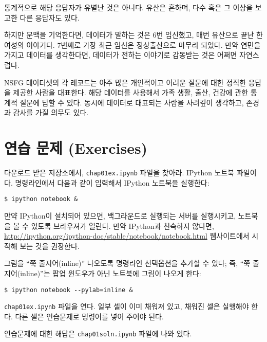 통계적으로 해당 응답자가 유별난 것은 아니다. 유산은 흔하며, 다수 혹은 그 이상을 보고한 다른 응답자도 있다. 

하지만 문맥을 기억한다면, 데이터가 말하는 것은 6번 임신했고, 매번 유산으로 끝난 한 여성의 이야기다.
7번째로 가장 최근 임신은 정상출산으로 마무리 되었다. 만약 연민을 가지고 데이터를 생각한다면, 데이터가 전하는 이야기로 감동받는 것은 어쩌면 자연스럽다. 

NSFG 데이터셋의 각 레코드는 아주 많은 개인적이고 어려운 질문에 대한 정직한 응답을 제공한 사람을 대표한다. 해당 데이터를 사용해서 가족 생활, 출산, 건강에 관한 통계적 질문에 답할 수 있다. 동시에 데이터로 대표되는 사람을 사려깊이 생각하고, 존경과 감사를 가질 의무도 있다.



\section{연습 문제 (Exercises)}

\begin{exercise}
다운로드 받은 저장소에서, \verb"chap01ex.ipynb" 파일을 찾아라. IPython 노트북 파일이다. 
명령라인에서 다음과 같이 입력해서 IPython 노트북을 실행한다:

\begin{verbatim}
$ ipython notebook &
\end{verbatim}

만약 IPython이 설치되어 있으면, 백그라운드로 실행되는 서버를 실행시키고,
노트북을 볼 수 있도록 브라우져가 열린다. 만약 IPython과 친숙하지 않다면, 
\url{http://ipython.org/ipython-doc/stable/notebook/notebook.html} 웹사이트에서
시작해 보는 것을 권장한다.

그림을 ``쭉 줄지어(inline)'' 나오도록 명령라인 선택옵션을 추가할 수 있다; 
즉, ``쭉 줄지어(inline)''는 팝업 윈도우가 아닌 노트북에 그림이 나오게 한다:

\begin{verbatim}
$ ipython notebook --pylab=inline &
\end{verbatim}

\verb"chap01ex.ipynb" 파일을 연다. 일부 셀이 이미 채워져 있고, 채워진 셀은 실행해야 한다.
다른 셀은 연습문제로 명령어를 넣어 주어야 된다.

연습문제에 대한 해답은 \verb"chap01soln.ipynb" 파일에 나와 있다.
\end{exercise}


